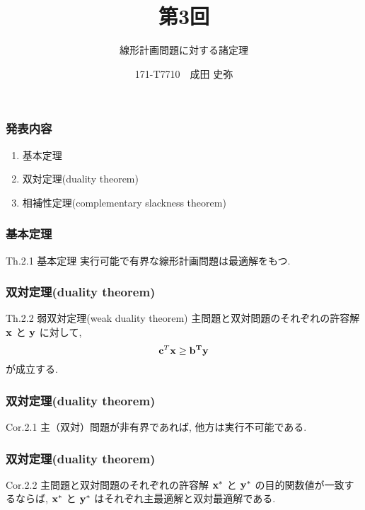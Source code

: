\documentclass[unicode, 12pt, aspectratio = 169]{beamer}
\title{第3回}
\subtitle{線形計画問題に対する諸定理}
\author{171-T7710　成田 史弥}
\institute{工学部　数理工学科　城本研究室}
\date{} %
\begin{document}
\begin{frame}
	\titlepage
\end{frame}

\begin{frame}[fragile]
	\frametitle{発表内容}
	\begin{enumerate}
		\item 基本定理
		\item 双対定理(duality theorem)
		\item 相補性定理(complementary slackness theorem)
	\end{enumerate}
\end{frame}

\begin{frame}[fragile]
	\frametitle{基本定理}
		\begin{itembox}[l]{Th.2.1 基本定理}
			実行可能で有界な線形計画問題は最適解をもつ.
		\end{itembox}
\end{frame}

\begin{frame}[fragile]
	\frametitle{双対定理(duality theorem)}
		\begin{itembox}[l]{Th.2.2 弱双対定理(weak duality theorem)}
			主問題と双対問題のそれぞれの許容解 $\bf x$ と $\bf y$ に対して, 
			\[
				{\bf c}^T \bf x \ge {\bf b}^T \bf y
			\]
			が成立する.
		\end{itembox}
\end{frame}

\begin{frame}[fragile]
	\frametitle{双対定理(duality theorem)}
		\begin{itembox}[l]{Cor.2.1}
			主（双対）問題が非有界であれば, 他方は実行不可能である.
		\end{itembox}
\end{frame}

\begin{frame}[fragile]
	\frametitle{双対定理(duality theorem)}
		\begin{itembox}[l]{Cor.2.2}
			主問題と双対問題のそれぞれの許容解 ${\bf x}^*$ と ${\bf y}^*$ の目的関数値が一致するならば, 
			${\bf x}^*$ と ${\bf y}^*$ はそれぞれ主最適解と双対最適解である.
		\end{itembox}
\end{frame}
\end{document}
